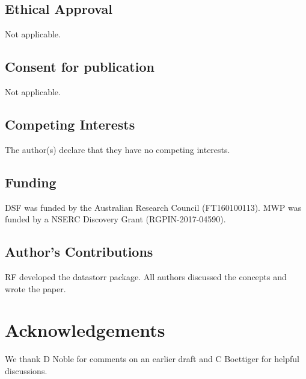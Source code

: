 \documentclass[a4paper,num-refs]{oup-contemporary}
\begin{document}
\subsection{Ethical Approval}
Not applicable.

\subsection{Consent for publication}
Not applicable.
\subsection{Competing Interests}
The author(s) declare that they have no competing interests. 

\subsection{Funding}

DSF was funded by the Australian Research Council (FT160100113). MWP was funded by a NSERC Discovery Grant (RGPIN-2017-04590).

\subsection{Author's Contributions}
RF developed the datastorr package. All authors discussed the concepts and wrote the paper. 

\section{Acknowledgements}

We thank D Noble for comments on an earlier draft and C Boettiger for helpful discussions. 




\end{document}
